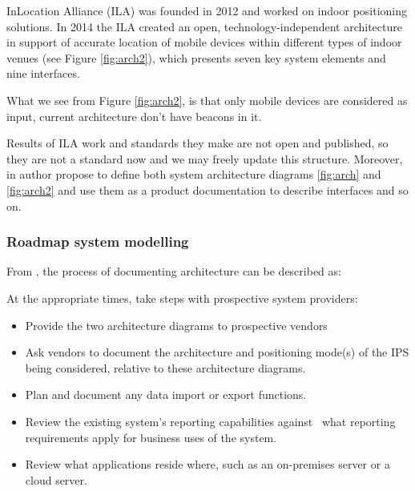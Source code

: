 InLocation Alliance (ILA) was founded in 2012 and worked on indoor positioning solutions. In 2014 the ILA created an open, technology-independent architecture in support of accurate location of mobile devices within different types of indoor venues (see Figure \ref{fig:arch2}), which presents seven key system elements and nine interfaces.

What we see from Figure \ref{fig:arch2}, is that only mobile devices are considered as input, current architecture don't have beacons in it.

Results of ILA work and standards they make are not open and published, so they are not a standard now and we may freely update this structure.
Moreover, in \cite{Security} author propose to define both system architecture diagrams \ref{fig:arch} and \ref{fig:arch2} and use them as a product documentation to describe interfaces and so on.



\subsubsection{Roadmap system modelling}

From \cite{Security}, the process of documenting architecture can be described as:

At the appropriate times, take steps with prospective system providers:
\begin{itemize}
	\item Provide the two architecture diagrams to prospective vendors
	\item Ask vendors to document the architecture and positioning mode(s) of the IPS being considered, relative to these architecture diagrams.
	\item Plan and document any data import or export functions.
	\item Review the existing system’s reporting capabilities against \ what reporting requirements apply for business uses of the system.
	\item Review what applications reside where, such as an on-premises server or a cloud server.
\end{itemize}

